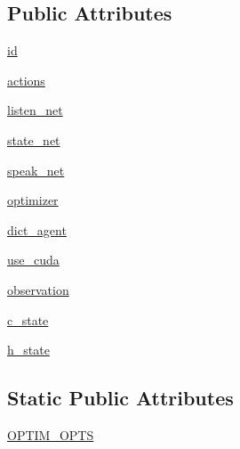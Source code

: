 \subsection*{Public Attributes}
\begin{DoxyCompactItemize}
\item 
\hyperlink{classprojects_1_1taskntalk_1_1coopgame__agent_1_1CooperativeGameAgent_ab1d8f1563dd1c2fc4f2716f4b193a68e}{id}
\item 
\hyperlink{classprojects_1_1taskntalk_1_1coopgame__agent_1_1CooperativeGameAgent_afc43683bdc26833326ee8b1249f1009a}{actions}
\item 
\hyperlink{classprojects_1_1taskntalk_1_1coopgame__agent_1_1CooperativeGameAgent_a1c7bbe7c817146f3f4d9cbe68a52692b}{listen\+\_\+net}
\item 
\hyperlink{classprojects_1_1taskntalk_1_1coopgame__agent_1_1CooperativeGameAgent_a09ffa1bb1ab48ffc8310e683918c930f}{state\+\_\+net}
\item 
\hyperlink{classprojects_1_1taskntalk_1_1coopgame__agent_1_1CooperativeGameAgent_aea61853aed7368fea4e2826dd1d551b4}{speak\+\_\+net}
\item 
\hyperlink{classprojects_1_1taskntalk_1_1coopgame__agent_1_1CooperativeGameAgent_a20be5fabcb0e4716fdc6fb9242f317ef}{optimizer}
\item 
\hyperlink{classprojects_1_1taskntalk_1_1coopgame__agent_1_1CooperativeGameAgent_ac7e33d98b63ce28369f88a59b631726a}{dict\+\_\+agent}
\item 
\hyperlink{classprojects_1_1taskntalk_1_1coopgame__agent_1_1CooperativeGameAgent_a070a6528c2814e0df9e714bdc178c736}{use\+\_\+cuda}
\item 
\hyperlink{classprojects_1_1taskntalk_1_1coopgame__agent_1_1CooperativeGameAgent_a935d5ccb012f0acfccddc34ba1c414ad}{observation}
\item 
\hyperlink{classprojects_1_1taskntalk_1_1coopgame__agent_1_1CooperativeGameAgent_a821bc77afbc968ce32f4ced5271ffb65}{c\+\_\+state}
\item 
\hyperlink{classprojects_1_1taskntalk_1_1coopgame__agent_1_1CooperativeGameAgent_a7ce6d36ddb01828b6caef828b71e7380}{h\+\_\+state}
\end{DoxyCompactItemize}
\subsection*{Static Public Attributes}
\begin{DoxyCompactItemize}
\item 
\hyperlink{classprojects_1_1taskntalk_1_1coopgame__agent_1_1CooperativeGameAgent_a20a6c84adea72558d4586ccd2f71eff9}{O\+P\+T\+I\+M\+\_\+\+O\+P\+TS}
\end{DoxyCompactItemize}


